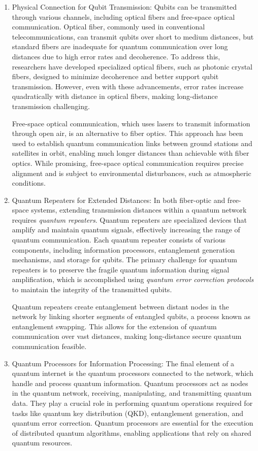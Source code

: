 \documentclass{article}
\begin{document}
	\begin{enumerate}
		\item Physical Connection for Qubit Transmission: 
		Qubits can be transmitted through various channels, including optical fibers and free-space optical communication. Optical fiber, commonly used in conventional telecommunications, can transmit qubits over short to medium distances, but standard fibers are inadequate for quantum communication over long distances due to high error rates and decoherence. To address this, researchers have developed specialized optical fibers, such as photonic crystal fibers, designed to minimize decoherence and better support qubit transmission. However, even with these advancements, error rates increase quadratically with distance in optical fibers, making long-distance transmission challenging.

		Free-space optical communication, which uses lasers to transmit information through open air, is an alternative to fiber optics. This approach has been used to establish quantum communication links between ground stations and satellites in orbit, enabling much longer distances than achievable with fiber optics. While promising, free-space optical communication requires precise alignment and is subject to environmental disturbances, such as atmospheric conditions.

		\item Quantum Repeaters for Extended Distances:
		In both fiber-optic and free-space systems, extending transmission distances within a quantum network requires \textit{quantum repeaters}. Quantum repeaters are specialized devices that amplify and maintain quantum signals, effectively increasing the range of quantum communication. Each quantum repeater consists of various components, including information processors, entanglement generation mechanisms, and storage for qubits. The primary challenge for quantum repeaters is to preserve the fragile quantum information during signal amplification, which is accomplished using \textit{quantum error correction protocols} to maintain the integrity of the transmitted qubits.

		Quantum repeaters create entanglement between distant nodes in the network by linking shorter segments of entangled qubits, a process known as entanglement swapping. This allows for the extension of quantum communication over vast distances, making long-distance secure quantum communication feasible.

		\item Quantum Processors for Information Processing:
		The final element of a quantum internet is the quantum processors connected to the network, which handle and process quantum information. Quantum processors act as nodes in the quantum network, receiving, manipulating, and transmitting quantum data. They play a crucial role in performing quantum operations required for tasks like quantum key distribution (QKD), entanglement generation, and quantum error correction. Quantum processors are essential for the execution of distributed quantum algorithms, enabling applications that rely on shared quantum resources.

	\end{enumerate}
\end{document}
